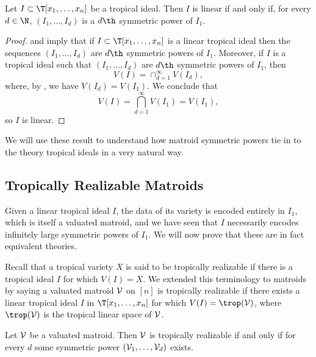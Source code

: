 \begin{corollary}\label{cor:hfSymprodEquiv}
Let $I\subset \T[x_1,\dots,x_n]$ be a tropical ideal. Then $I$ is linear if and only if, for every $d\in \N$, $(I_1,\dots,I_d)$ is a $d\th$ symmetric power of $I_1$. 
\end{corollary}
\begin{proof}
     and  imply that if $I\subset \T[x_1,\dots,x_n]$ is a linear tropical ideal then the sequences $(I_1,\dots,I_d)$ are $d\th$ symmetric powers of $I_1$. Moreover, if $I$ is a tropical ideal such that $(I_1,\dots,I_d)$ are $d\th$ symmetric powers of $I_1$, then 
    $$V(I) = \cap_{d=1}^\infty V(I_d),$$
    where, by , we have $V(I_d)=V(I_1)$. We conclude that
    $$V(I)=\bigcap_{d=1}^\infty V(I_1) = V(I_1),$$
    so $I$ is linear.
\end{proof}

 We will use these result to understand how matroid symmetric powers tie in to the theory tropical ideals in a very natural way.

\subsection{Tropically Realizable Matroids}\label{subsec:TropRealizableMatroids}

Given a linear tropical ideal $I$, the data of its variety is encoded entirely in $I_1$, which is itself a valuated matroid, and we have seen that $I$ necessarily encodes infinitely large symmetric powers of $I_1$. We will now prove that these are in fact equivalent theories.

Recall that a tropical variety $X$ is said to be tropically realizable if there is a tropical ideal $I$ for which $V(I)= X$. We extended this terminology to matroids by saying a valuated matroid $\mathcal{V}$ on $[n]$ is tropically realizable if there exists a linear tropical ideal $I$ in $\T[x_1,\dots,x_n]$ for which $V(I)=\trop(\sV)$, where $\trop(\sV)$ is the tropical linear space of $\mathcal{V}$.

\begin{theorem}\label{thm:linearMatroidCorres}
Let $\mathcal{V}$ be a valuated matroid. Then $\mathcal{V}$ is tropically realizable if and only if for every $d$ some symmetric power $(\mathcal{V}_1,\dots,\mathcal{V}_d)$ exists.
\end{theorem}

